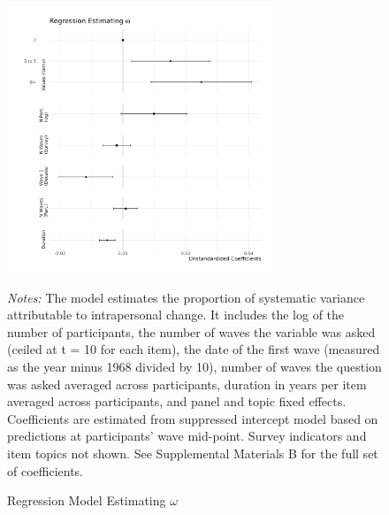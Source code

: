 \documentclass[
  12pt,
]{article}
\begin{document}
\newpage

\begin{figure}[ht]
\caption{Regression Model Estimating $\omega$}

\begin{center}\includegraphics[width=300px]{../figures/figure_2} \end{center}

\textit{Notes:} The model estimates the proportion of systematic variance attributable to intrapersonal change. It includes the log of the number of participants, the number of waves the variable was asked (ceiled at t = 10 for each item), the date of the first wave (measured as the year minus 1968 divided by 10), number of waves the question was asked averaged across participants, duration in years per item averaged across participants, and panel and topic fixed effects. Coefficients are estimated from suppressed intercept model based on predictions at participants' wave mid-point. Survey indicators and item topics not shown. See Supplemental Materials B for the full set of coefficients.
\end{figure}

\newpage
\end{document}
